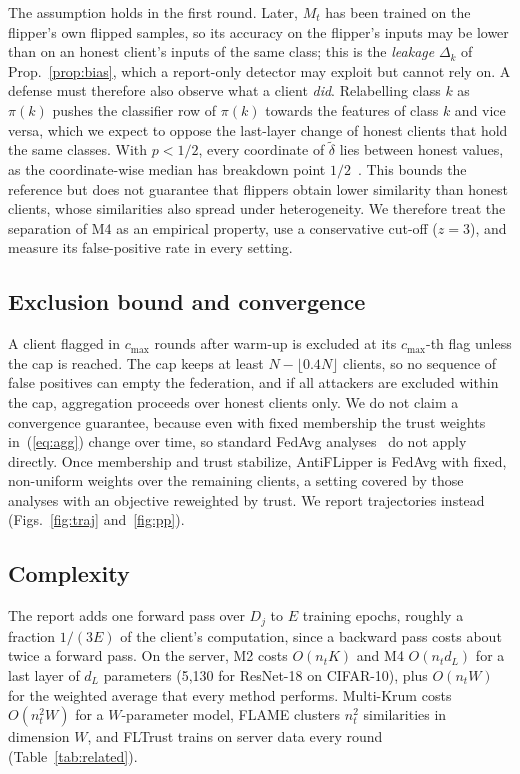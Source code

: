\documentclass[journal]{IEEEtran}
\begin{document}
The assumption holds in the first round. Later, $M_t$ has been trained on the flipper's own flipped samples, so its accuracy on the flipper's inputs may be lower than on an honest client's inputs of the same class; this is the \emph{leakage} $\Delta_k$ of Prop.~\ref{prop:bias}, which a report-only detector may exploit but cannot rely on. A defense must therefore also observe what a client \emph{did}. Relabelling class $k$ as $\pi(k)$ pushes the classifier row of $\pi(k)$ towards the features of class $k$ and vice versa, which we expect to oppose the last-layer change of honest clients that hold the same classes. With $p<1/2$, every coordinate of $\tilde\delta$ lies between honest values, as the coordinate-wise median has breakdown point $1/2$~\cite{yin2018byzantine}. This bounds the reference but does not guarantee that flippers obtain lower similarity than honest clients, whose similarities also spread under heterogeneity. We therefore treat the separation of M4 as an empirical property, use a conservative cut-off ($z{=}3$), and measure its false-positive rate in every setting.

\subsection{Exclusion bound and convergence}
A client flagged in $c_{\max}$ rounds after warm-up is excluded at its $c_{\max}$-th flag unless the cap is reached. The cap keeps at least $N-\lfloor0.4N\rfloor$ clients, so no sequence of false positives can empty the federation, and if all attackers are excluded within the cap, aggregation proceeds over honest clients only. We do not claim a convergence guarantee, because even with fixed membership the trust weights in~(\ref{eq:agg}) change over time, so standard FedAvg analyses~\cite{li2020convergence} do not apply directly. Once membership and trust stabilize, AntiFLipper is FedAvg with fixed, non-uniform weights over the remaining clients, a setting covered by those analyses with an objective reweighted by trust. We report trajectories instead (Figs.~\ref{fig:traj} and~\ref{fig:pp}).

\subsection{Complexity}
\label{sec:complexity}
The report adds one forward pass over $D_j$ to $E$ training epochs, roughly a fraction $1/(3E)$ of the client's computation, since a backward pass costs about twice a forward pass. On the server, M2 costs $O(n_tK)$ and M4 $O(n_t d_L)$ for a last layer of $d_L$ parameters (5{,}130 for ResNet-18 on CIFAR-10), plus $O(n_tW)$ for the weighted average that every method performs. Multi-Krum costs $O(n_t^2W)$ for a $W$-parameter model, FLAME clusters $n_t^2$ similarities in dimension $W$, and FLTrust trains on server data every round (Table~\ref{tab:related}).
\end{document}
